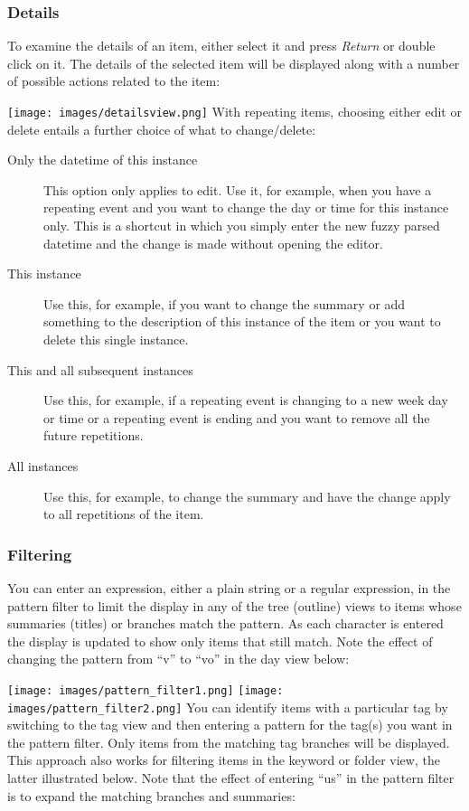\documentclass[]{article}
\makeatletter
\def\maxwidth{\ifdim\Gin@nat@width>\linewidth\linewidth
\else\Gin@nat@width\fi}
\let\Oldincludegraphics\includegraphics
\renewcommand{\includegraphics}[1]{\Oldincludegraphics[width=\maxwidth]{#1}}
\makeatother
\begin{document}
\subsubsection{Details}

To examine the details of an item, either select it and press
\emph{Return} or double click on it. The details of the selected item
will be displayed along with a number of possible actions related to the
item:

\texttt{[image: images/detailsview.png]}
With repeating items, choosing either edit or delete entails a further
choice of what to change/delete:

\begin{description}
\item[Only the datetime of this instance]
This option only applies to edit. Use it, for example, when you have a
repeating event and you want to change the day or time for this instance
only. This is a shortcut in which you simply enter the new fuzzy parsed
datetime and the change is made without opening the editor.
\item[This instance]
Use this, for example, if you want to change the summary or add
something to the description of this instance of the item or you want to
delete this single instance.
\item[This and all subsequent instances]
Use this, for example, if a repeating event is changing to a new week
day or time or a repeating event is ending and you want to remove all
the future repetitions.
\item[All instances]
Use this, for example, to change the summary and have the change apply
to all repetitions of the item.
\end{description}

\subsubsection{Filtering}

You can enter an expression, either a plain string or a regular
expression, in the pattern filter to limit the display in any of the
tree (outline) views to items whose summaries (titles) or branches match
the pattern. As each character is entered the display is updated to show
only items that still match. Note the effect of changing the pattern
from ``v'' to ``vo'' in the day view below:

\texttt{[image: images/pattern\_filter1.png]}
\texttt{[image: images/pattern\_filter2.png]}
You can identify items with a particular tag by switching to the tag
view and then entering a pattern for the tag(s) you want in the pattern
filter. Only items from the matching tag branches will be displayed.
This approach also works for filtering items in the keyword or folder
view, the latter illustrated below. Note that the effect of entering
``us'' in the pattern filter is to expand the matching branches and
summaries:
\end{document}
